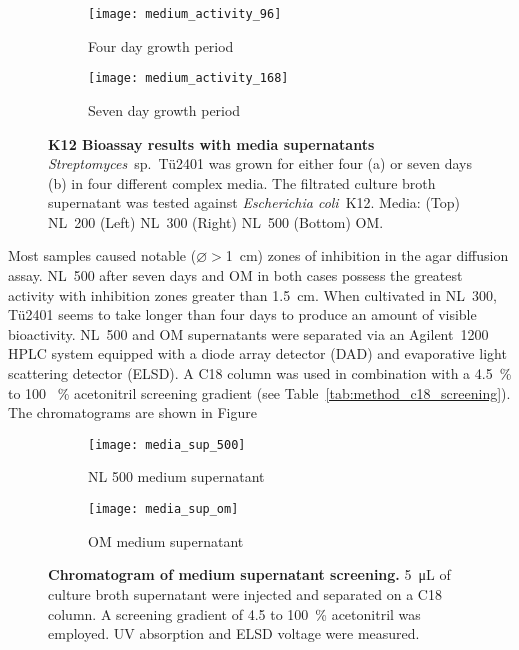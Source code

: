 \begin{figure}[htbp]
	\centering
	\begin{subfigure}{0.4\textwidth}
		\texttt{[image: medium\_activity\_96]}
		\caption{Four day growth period}
	\end{subfigure}%
	\begin{subfigure}{0.4\textwidth}
		\texttt{[image: medium\_activity\_168]}
		\caption{Seven day growth period}
	\end{subfigure}
	\caption[K12 Bioassay results with media supernatants]{%
		\textbf{K12 Bioassay results with media supernatants} \textit{Streptomyces}~sp.~Tü2401 was grown for either four (a)
    or seven days (b) in four different complex media. The filtrated culture broth supernatant was tested against
    \textit{Escherichia coli}~K12. Media: (Top) NL~200 (Left) NL~300 (Right) NL~500 (Bottom) OM.}
	\label{fig:medium_activity}
\end{figure}

Most samples caused notable ($\varnothing>$\SI{1}{\centi\meter}) zones of inhibition in the agar diffusion assay.
NL~500 after seven days and OM in both cases possess the greatest activity with inhibition zones greater than \SI{1.5}{\centi\meter}.
When cultivated in NL~300, Tü2401 seems to take longer than four days to produce an amount of visible bioactivity.
NL~500 and OM supernatants were separated via an Agilent~1200 HPLC system equipped with a diode array detector (DAD) and evaporative light scattering detector (ELSD).
A C18 column was used in combination with a 4.5~\% to 100~ \% acetonitril screening gradient (see Table~\ref{tab:method_c18_screening}). The chromatograms are shown in Figure 

\begin{figure}[htbp]
	\centering
	\begin{subfigure}{0.8\textwidth}
		\texttt{[image: media\_sup\_500]}
		\caption{NL 500 medium supernatant}
	\end{subfigure}
	\begin{subfigure}{0.8\textwidth}
		\texttt{[image: media\_sup\_om]}
		\caption{OM medium supernatant}
	\end{subfigure}
	\caption[Chromatogram of medium supernatant screening]{%
		\textbf{Chromatogram of medium supernatant screening.} \SI{5}{\micro\liter} of culture broth supernatant were injected and separated on a C18 column.
		A screening gradient of 4.5 to 100~\% acetonitril was employed. 
		UV absorption and ELSD voltage were measured.
	}
	\label{fig:results_medium_screen}
\end{figure}

